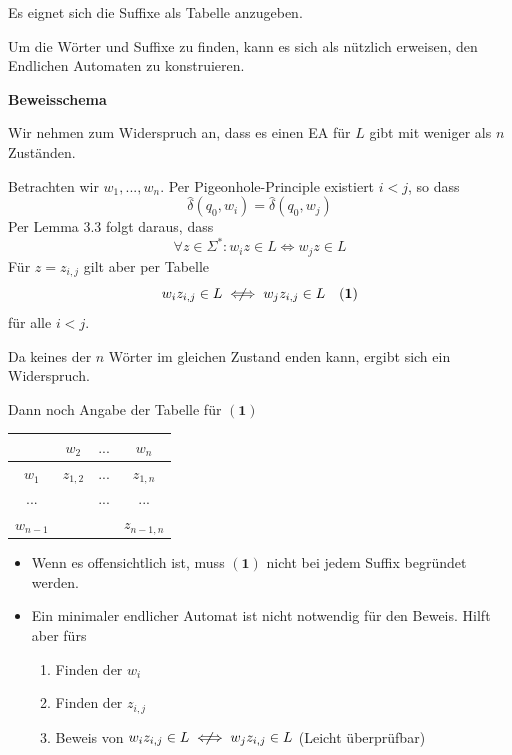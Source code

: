\documentclass[a4paper, 11pt]{article}
\newcommand\myTitle[1]{{\large \textbf {#1}}}
\begin{document}
        Es eignet sich die Suffixe als Tabelle anzugeben.
    
        Um die Wörter und Suffixe zu finden, kann es sich als nützlich erweisen, den Endlichen Automaten zu konstruieren.
    
    
    
        \myTitle{Beweisschema}

        Wir nehmen zum Widerspruch an, dass es einen EA für $L$ gibt mit weniger als $n$ Zuständen.
    
        Betrachten wir $w_1, ...,w_n$. Per Pigeonhole-Principle existiert $i < j$, so dass
        $$\hat{\delta}(q_0, w_i) = \hat{\delta}(q_0, w_j)$$
        Per Lemma 3.3 folgt daraus, dass 
        $$\forall z \in \Sigma^*: w_iz \in L \iff w_jz \in L$$
        Für $z = z_{i,j}$ gilt aber per Tabelle $$w_iz_{i,j} \in L \centernot{\iff} w_jz_{i,j} \in L \quad \mathbf{(1)}$$ für alle $i< j$. 
        
        Da keines der $n$ Wörter im gleichen Zustand enden kann, ergibt sich ein Widerspruch.
    
        Dann noch Angabe der Tabelle für $\mathbf{(1)}$
        \begin{table}
            \centering
            \begin{tabular}{c|ccc}
                & $w_2$ & $...$ & $w_n$\\
                \hline
                $w_1$& $z_{1,2}$& ...&$z_{1,n}$\\
                $...$&  & $...$&$...$\\
                $w_{n-1}$& &  & $z_{n-1, n}$
            \end{tabular}
        \end{table}
        \begin{itemize}[label=-]
            \item Wenn es offensichtlich ist, muss $\mathbf{(1)}$ nicht bei jedem Suffix begründet werden.
            \item Ein minimaler endlicher Automat ist nicht notwendig für den Beweis. Hilft aber fürs
            \begin{enumerate}[label=\roman*.]
                \item Finden der $w_i$
                \item Finden der $z_{i, j}$
                \item Beweis von $w_iz_{i,j} \in L \centernot{\iff} w_jz_{i,j} \in L$ (Leicht überprüfbar)
            \end{enumerate}
        \end{itemize}
    
\end{document}
